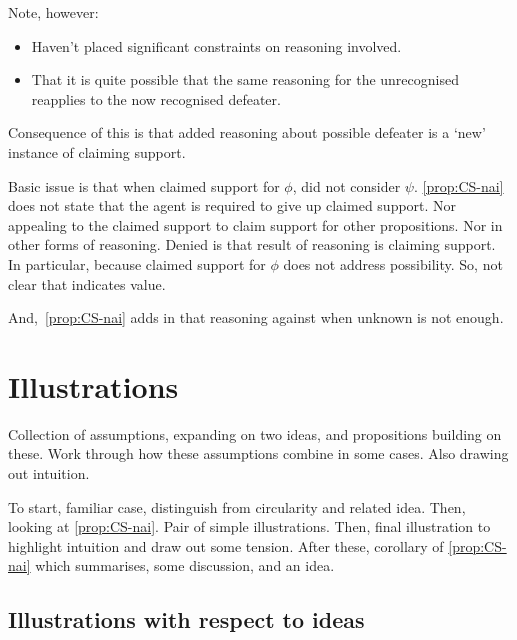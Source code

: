 \begin{note}
  Note, however:

  \begin{itemize}
  \item Haven't placed significant constraints on reasoning involved.
  \item That it is quite possible that the same reasoning for the unrecognised reapplies to the now recognised defeater.
  \end{itemize}
\end{note}

\begin{note}
  Consequence of this is that added reasoning about possible defeater is a `new' instance of claiming support.
\end{note}

\begin{note}
  Basic issue is that when claimed support for \(\phi\), did not consider \(\psi\).
  \autoref{prop:CS-nai} does not state that the agent is required to give up claimed support.
  Nor appealing to the claimed support to claim support for other propositions.
  Nor in other forms of reasoning.
  Denied is that result of reasoning is claiming support.
  In particular, because claimed support for \(\phi\) does not address possibility.
  So, not clear that indicates value.

  And,~\autoref{prop:CS-nai} adds in that reasoning against when unknown is not enough.
\end{note}

\section{Illustrations}
\label{sec:CS:illustrations}



\begin{note}
  Collection of assumptions, expanding on two ideas, and propositions building on these.
  Work through how these assumptions combine in some cases.
  Also drawing out intuition.

  To start, familiar case, distinguish from circularity and related idea.
  Then, looking at \autoref{prop:CS-nai}.
  Pair of simple illustrations.
  Then, final illustration to highlight intuition and draw out some tension.
  After these, corollary of \autoref{prop:CS-nai} which summarises, some discussion, and an idea.
\end{note}

\subsection{Illustrations with respect to ideas}

